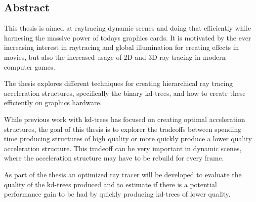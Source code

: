 

\begin{center}
\begin{minipage}{0.7\textwidth}
\section*{Abstract}

This thesis is aimed at raytracing dynamic scenes and doing that efficiently
while harnesing the massive power of todays graphics cards. It is motivated by
the ever increasing interest in raytracing and global illumination for creating
effects in movies, but also the increased usage of 2D and 3D ray tracing in
modern computer games.

The thesis explores different techniques for creating hierarchical ray tracing
acceleration structures, specifically the binary kd-trees, and how to create
these efficiently on graphics hardware.

While previous work with kd-trees has focused on creating optimal acceleration
structures, the goal of this thesis is to explorer the tradeoffs between
spending time producing structures of high quality or more quickly produce a
lower quality acceleration structure. This tradeoff can be very important in
dynamic scenes, where the acceleration structure may have to be rebuild for
every frame.

As part of the thesis an optimized ray tracer will be developed to evaluate the
quality of the kd-trees produced and to estimate if there is a potential
performance gain to be had by quickly producing kd-trees of lower quality.

\end{minipage}
\end{center}










